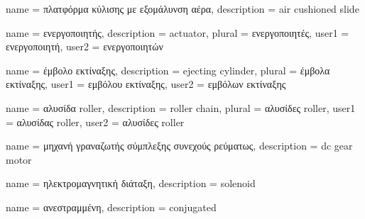 	{name			= {πλατφόρμα κύλισης με εξομάλυνση αέρα},
	 description	= {air cushioned slide}
	}
	
	{name			= {ενεργοποιητής},
	 description	= {actuator},
	 plural			= {ενεργοποιητές},
	 user1			= {ενεργοποιητή},
	 user2			= {ενεργοποιητών}
	}
	
	{name			= {έμβολο εκτίναξης},
	 description	= {ejecting cylinder},
	 plural			= {έμβολα εκτίναξης},
	 user1			= {εμβόλου εκτίναξης},
	 user2			= {εμβόλων εκτίναξης}
	}

	{name			= {αλυσίδα roller},
	 description	= {roller chain},
	 plural			= {αλυσίδες roller},
	 user1			= {αλυσίδας roller},
	 user2			= {αλυσίδες roller}
	}
	
	{name			= {μηχανή γραναζωτής σύμπλεξης συνεχούς ρεύματως},
	 description	= {dc gear motor}
	}
	
	{name			= {ηλεκτρομαγνητική διάταξη},
	 description	= {solenoid}
	}
	
	{name			= {ανεστραμμένη},
	 description	= {conjugated}
	}